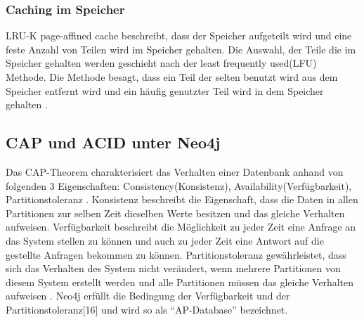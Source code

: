 \subsubsection{Caching im Speicher}
LRU-K page-affined cache beschreibt, dass der Speicher aufgeteilt wird und eine feste Anzahl von Teilen wird im Speicher gehalten. Die Auswahl, der Teile die im Speicher gehalten werden geschieht nach der least frequently used(LFU) Methode. Die Methode besagt, dass ein Teil der selten benutzt wird aus dem Speicher entfernt wird und ein häufig genutzter Teil wird in dem Speicher gehalten \parencite{robinson2013graph}.
\subsection{CAP und ACID unter Neo4j}
Das CAP-Theorem charakterisiert  das Verhalten einer Datenbank anhand von folgenden 3 Eigenschaften: Consistency(Konsistenz), Availability(Verfügbarkeit), Partitionstoleranz \parencite{simon2000brewer}. Konsistenz beschreibt die Eigenschaft, dass die Daten in allen Partitionen zur selben Zeit dieselben Werte besitzen und das gleiche Verhalten aufweisen. Verfügbarkeit beschreibt die Möglichkeit zu jeder Zeit eine Anfrage an das System stellen zu können und auch zu jeder Zeit eine Antwort auf die gestellte Anfragen bekommen zu können. Partitionstoleranz gewährleistet, dass sich das Verhalten des System nicht verändert, wenn mehrere Partitionen von diesem System erstellt werden und alle Partitionen müssen das gleiche Verhalten aufweisen  \parencite{simon2000brewer}. Neo4j erfüllt die Bedingung der Verfügbarkeit und der  Partitionstoleranz[16] und wird so als “AP-Database” bezeichnet. \newline
